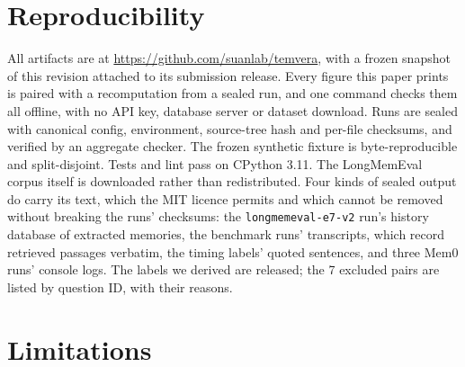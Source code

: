 \documentclass[conference]{IEEEtran}
\newcommand{\runeseven}{\texttt{longmemeval-\allowbreak e7-\allowbreak v2}}
\begin{document}
\section{Reproducibility}

All artifacts are at \url{https://github.com/suanlab/temvera}, with a frozen
snapshot of this revision attached to its submission release. Every figure this
paper prints is paired with a recomputation from a sealed run, and one command
checks them all offline, with no API key, database server or dataset download.
Runs are sealed
with canonical config, environment, source-tree hash and per-file checksums, and
verified by an aggregate checker. The frozen synthetic
fixture is byte-reproducible and split-disjoint. Tests and lint pass on CPython
3.11. The LongMemEval corpus itself is downloaded rather than redistributed.
Four kinds of sealed output do carry its text, which the MIT licence permits and
which cannot be removed without breaking the runs' checksums: the
\runeseven{} run's history database of extracted memories, the benchmark
runs' transcripts, which record retrieved passages verbatim, the timing
labels' quoted sentences, and three Mem0 runs' console logs. The labels we
derived are released; the 7 excluded pairs are listed by question ID, with
their reasons.

\section*{Limitations}
\end{document}
